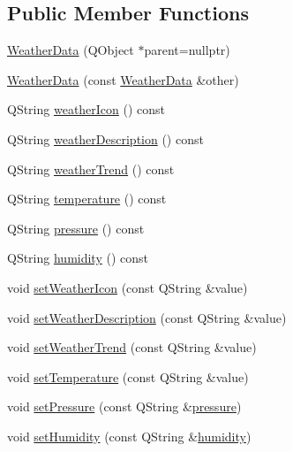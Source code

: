 \subsection*{Public Member Functions}
\begin{DoxyCompactItemize}
\item 
\hyperlink{class_weather_data_a836ebdd7583f1ff908f36583dd9184a3}{Weather\+Data} (Q\+Object $\ast$parent=nullptr)
\item 
\hyperlink{class_weather_data_a48baeaa6b2a77d2a5e008159188416e8}{Weather\+Data} (const \hyperlink{class_weather_data}{Weather\+Data} \&other)
\item 
Q\+String \hyperlink{class_weather_data_a5baf2d9cc08741d7af4a07d61df95ee4}{weather\+Icon} () const
\item 
Q\+String \hyperlink{class_weather_data_a63a3528697c8681bd32d4d170ec91f76}{weather\+Description} () const
\item 
Q\+String \hyperlink{class_weather_data_a04b09d8065d64b62f1ad679b4493fc62}{weather\+Trend} () const
\item 
Q\+String \hyperlink{class_weather_data_a5a193e8410e3a146de59bab224cd88f0}{temperature} () const
\item 
Q\+String \hyperlink{class_weather_data_af726e713890bd6d310fe4a718dd69c77}{pressure} () const
\item 
Q\+String \hyperlink{class_weather_data_a0a83b2ee5398eaba062e3c6fe9264a3d}{humidity} () const
\item 
void \hyperlink{class_weather_data_a2a8093aaf20e1fb3c63c429a4ae0a977}{set\+Weather\+Icon} (const Q\+String \&value)
\item 
void \hyperlink{class_weather_data_a68686722f2e0bbf5cb28f0fdc96e280d}{set\+Weather\+Description} (const Q\+String \&value)
\item 
void \hyperlink{class_weather_data_afeefe6463c52698e2fc4c010d8d35dc2}{set\+Weather\+Trend} (const Q\+String \&value)
\item 
void \hyperlink{class_weather_data_afee514cbb8713059cf8d0602b33cadf5}{set\+Temperature} (const Q\+String \&value)
\item 
void \hyperlink{class_weather_data_ad5b453016656864e2bc3a09fc75919a0}{set\+Pressure} (const Q\+String \&\hyperlink{class_weather_data_a2529c61089c163abf0e2dd80a51c47cb}{pressure})
\item 
void \hyperlink{class_weather_data_aad895695b5f0651c58657973f2140509}{set\+Humidity} (const Q\+String \&\hyperlink{class_weather_data_acf762ef73e6056b6cc8716e1aa1c7220}{humidity})
\end{DoxyCompactItemize}
